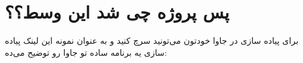 \documentclass[]{article}
\begin{document}
\begin{flushleft}
\href{https://blog.feathersjs.com/design-patterns-for-modern-web-apis-1f046635215}{\textcolor{blue}{\underline{}}}
\end{flushleft}

\section*{{\titr پس پروژه چی شد این وسط؟؟
}}

برای پیاده سازی  در جاوا خودتون می‌تونید سرچ کنید و به عنوان نمونه این لینک پیاده سازی یه برنامه ساده  تو جاوا رو توضیح می‌ده:

\begin{flushleft}
\href{https://happycoding.io/tutorials/java-server/rest-api#simple-example-rest-api}{\textcolor{blue}{\underline{}}}
\end{flushleft}
\end{document}
